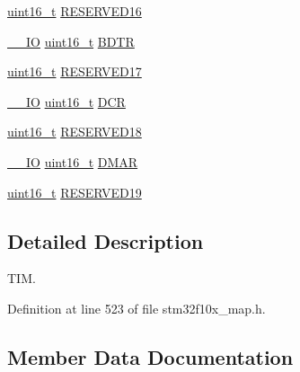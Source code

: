 \begin{DoxyCompactItemize}
\item 
\hyperlink{_p_e___types_8h_a1f1825b69244eb3ad2c7165ddc99c956}{uint16\+\_\+t} \hyperlink{struct_t_i_m___type_def_ada594311432f31830545027e195980ed}{R\+E\+S\+E\+R\+V\+E\+D16}
\item 
\hyperlink{group___c_m_s_i_s___c_m3__core__definitions_gaec43007d9998a0a0e01faede4133d6be}{\+\_\+\+\_\+\+IO} \hyperlink{_p_e___types_8h_a1f1825b69244eb3ad2c7165ddc99c956}{uint16\+\_\+t} \hyperlink{struct_t_i_m___type_def_a32bbedb8b418359c6873375ec949cf8b}{B\+D\+TR}
\item 
\hyperlink{_p_e___types_8h_a1f1825b69244eb3ad2c7165ddc99c956}{uint16\+\_\+t} \hyperlink{struct_t_i_m___type_def_aad6f1eb74535c7cda84b8ad8cb76d65e}{R\+E\+S\+E\+R\+V\+E\+D17}
\item 
\hyperlink{group___c_m_s_i_s___c_m3__core__definitions_gaec43007d9998a0a0e01faede4133d6be}{\+\_\+\+\_\+\+IO} \hyperlink{_p_e___types_8h_a1f1825b69244eb3ad2c7165ddc99c956}{uint16\+\_\+t} \hyperlink{struct_t_i_m___type_def_ad3186a43824621f049e7eff37c88ad4e}{D\+CR}
\item 
\hyperlink{_p_e___types_8h_a1f1825b69244eb3ad2c7165ddc99c956}{uint16\+\_\+t} \hyperlink{struct_t_i_m___type_def_a5f03da5369c7b0bf10fd480011b12718}{R\+E\+S\+E\+R\+V\+E\+D18}
\item 
\hyperlink{group___c_m_s_i_s___c_m3__core__definitions_gaec43007d9998a0a0e01faede4133d6be}{\+\_\+\+\_\+\+IO} \hyperlink{_p_e___types_8h_a1f1825b69244eb3ad2c7165ddc99c956}{uint16\+\_\+t} \hyperlink{struct_t_i_m___type_def_a4e0fbb52e6dd4bdabcb3f3b2f4bae40c}{D\+M\+AR}
\item 
\hyperlink{_p_e___types_8h_a1f1825b69244eb3ad2c7165ddc99c956}{uint16\+\_\+t} \hyperlink{struct_t_i_m___type_def_a58477bdaaf8fcbcd9c8411729daaf535}{R\+E\+S\+E\+R\+V\+E\+D19}
\end{DoxyCompactItemize}


\subsection{Detailed Description}
T\+IM. 

Definition at line 523 of file stm32f10x\+\_\+map.\+h.



\subsection{Member Data Documentation}

